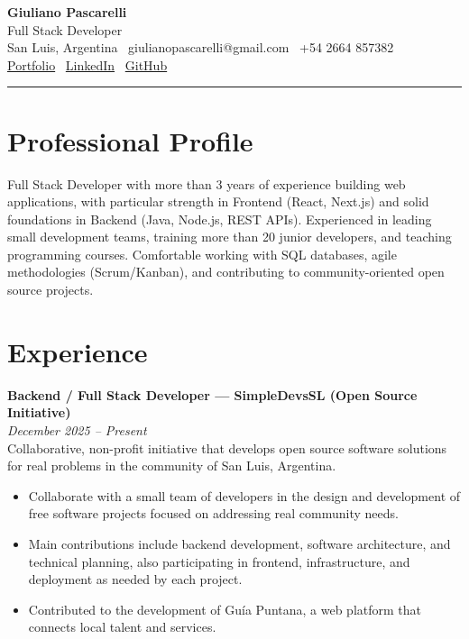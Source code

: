 \documentclass[10pt,a4paper]{article}
\newcommand{\entryheader}[2]{\textbf{#1}\\ \textit{#2}\\[1pt]}
\begin{document}
\pagestyle{empty}

\begin{center}
    {\LARGE \textbf{Giuliano Pascarelli}}\\
    \vspace{2pt}
    {\normalsize Full Stack Developer}\\
    \vspace{1.5pt}
    \small
    San Luis, Argentina \textbullet\ giulianopascarelli@gmail.com \textbullet\ +54 2664 857382\\
    \href{https://lelox028.github.io/}{Portfolio} \textbullet\
    \href{https://www.linkedin.com/in/giuliano-pascarelli-097100190/}{LinkedIn} \textbullet\
    \href{https://github.com/lelox028}{GitHub}
\end{center}

\vspace{2pt}
\hrule

\section*{Professional Profile}
Full Stack Developer with more than 3 years of experience building web applications, with particular strength in Frontend (React, Next.js) and solid foundations in Backend (Java, Node.js, REST APIs). Experienced in leading small development teams, training more than 20 junior developers, and teaching programming courses. Comfortable working with SQL databases, agile methodologies (Scrum/Kanban), and contributing to community-oriented open source projects.

\section*{Experience}

\entryheader{Backend / Full Stack Developer --- SimpleDevsSL (Open Source Initiative)}{December 2025 -- Present}
Collaborative, non-profit initiative that develops open source software solutions for real problems in the community of San Luis, Argentina.
\begin{itemize}[noitemsep, topsep=1pt, partopsep=0pt, leftmargin=16pt]
    \item Collaborate with a small team of developers in the design and development of free software projects focused on addressing real community needs.
    \item Main contributions include backend development, software architecture, and technical planning, also participating in frontend, infrastructure, and deployment as needed by each project.
    \item Contributed to the development of Guía Puntana, a web platform that connects local talent and services.
\end{itemize}
\end{document}
